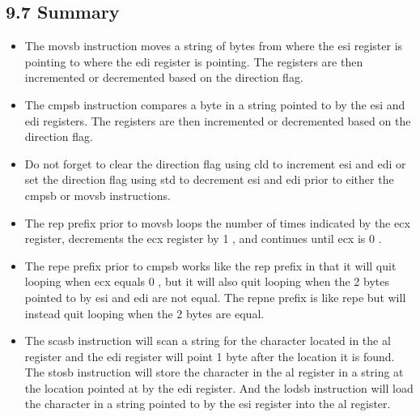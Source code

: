 \documentclass[10pt]{book}
\begin{document}
\begin{center}
\begin{center}
\begin{center}
\begin{center}
\subsection*{9.7 Summary}
\begin{itemize}
  \item The movsb instruction moves a string of bytes from where the esi register is pointing to where the edi register is pointing. The registers are then incremented or decremented based on the direction flag.
  \item The cmpsb instruction compares a byte in a string pointed to by the esi and edi registers. The registers are then incremented or decremented based on the direction flag.
  \item Do not forget to clear the direction flag using cld to increment esi and edi or set the direction flag using std to decrement esi and edi prior to either the cmpsb or movsb instructions.
  \item The rep prefix prior to movsb loops the number of times indicated by the ecx register, decrements the ecx register by 1 , and continues until ecx is 0 .
  \item The repe prefix prior to cmpsb works like the rep prefix in that it will quit looping when ecx equals 0 , but it will also quit looping when the 2 bytes pointed to by esi and edi are not equal. The repne prefix is like repe but will instead quit looping when the 2 bytes are equal.
  \item The scasb instruction will scan a string for the character located in the al register and the edi register will point 1 byte after the location it is found. The stosb instruction will store the character in the al register in a string at the location pointed at by the edi register. And the lodsb instruction will load the character in a string pointed to by the esi register into the al register.
\end{itemize}



\end{center}
\end{center}
\end{center}
\end{center}
\end{document}
